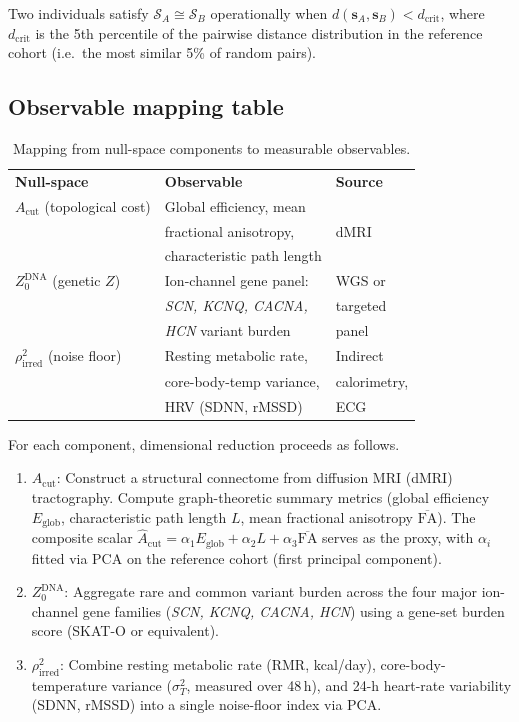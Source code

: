 \documentclass[aps,pre,twocolumn,superscriptaddress,floatfix]{revtex4-2}
\newcommand{\Acut}{A_{\text{cut}}}
\begin{document}
Two individuals satisfy
$\mathcal{S}_A\cong\mathcal{S}_B$
operationally when
$d(\bm{s}_A,\bm{s}_B) < d_{\text{crit}}$,
where $d_{\text{crit}}$ is the 5th percentile of the
pairwise distance distribution in the reference cohort
(i.e.\ the most similar 5\% of random pairs).

\subsection{Observable mapping table}
\label{app:observables}

\begin{table}[h]
\caption{Mapping from null-space components to
  measurable observables.}
\label{tab:observables}
\begin{ruledtabular}
\begin{tabular}{lll}
  \textbf{Null-space} & \textbf{Observable} & \textbf{Source} \\
  \colrule
  $\Acut$ (topological cost)
    & Global efficiency, mean &
    \\
    & fractional anisotropy, & dMRI \\
    & characteristic path length &
    \\[4pt]
  $Z_0^{\text{DNA}}$ (genetic $Z$)
    & Ion-channel gene panel: & WGS or \\
    & \textit{SCN, KCNQ, CACNA,} & targeted \\
    & \textit{HCN} variant burden & panel \\[4pt]
  $\rho_{\text{irred}}^2$ (noise floor)
    & Resting metabolic rate, & Indirect \\
    & core-body-temp variance, & calorimetry, \\
    & HRV (SDNN, rMSSD) & ECG
\end{tabular}
\end{ruledtabular}
\end{table}

For each component, dimensional reduction proceeds as
follows.
\begin{enumerate}
  \item $\Acut$: Construct a structural connectome from
    diffusion MRI (dMRI) tractography.  Compute
    graph-theoretic summary metrics (global efficiency
    $E_{\text{glob}}$, characteristic path length $L$,
    mean fractional anisotropy $\overline{\text{FA}}$).
    The composite scalar
    $\hat{A}_{\text{cut}}
      = \alpha_1 E_{\text{glob}}
      + \alpha_2 L
      + \alpha_3 \overline{\text{FA}}$
    serves as the proxy, with $\alpha_i$ fitted via PCA
    on the reference cohort (first principal component).
  \item $Z_0^{\text{DNA}}$: Aggregate rare and common
    variant burden across the four major ion-channel gene
    families (\textit{SCN, KCNQ, CACNA, HCN}) using a
    gene-set burden score (SKAT-O or equivalent).
  \item $\rho_{\text{irred}}^2$: Combine resting metabolic
    rate (RMR, kcal/day), core-body-temperature variance
    ($\sigma_T^2$, measured over 48\,h), and 24-h heart-rate
    variability (SDNN, rMSSD) into a single noise-floor
    index via PCA.
\end{enumerate}
\end{document}
